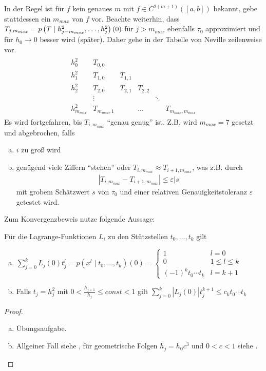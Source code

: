 \label{7.3.7}
In der Regel ist für $f$ kein genaues $m$ mit $f\in C^{2(m+1)}([a,b])$
bekannt,
gebe stattdessen ein $m_{max}$ von $f$ vor.
Beachte weiterhin, dass 
$T_{j,m_{max}}=p\left( T \mid h_{j-m_{max}}^2,\dotsc,h_j^2 \right)(0)$
für $j>m_{max}$ ebenfalls $\tau_0$ approximiert
und für $h_0\to 0$ besser wird (später).
Daher gehe in der Tabelle von Neville zeilenweise vor.
\begin{align*}
  \begin{array}{lccccc}
    h_0^2 & T_{0,0}\\
    h_1^2 & T_{1,0} & T_{1,1}\\
    h_2^2 & T_{2,0} & T_{2,1} & T_{2,2} \\
          & \vdots&&&\ddots\\
    h_{m_{max}}^2 & T_{m_{max},1} &&\dots && T_{m_{max},m_{max}}
  \end{array}
\end{align*}
\label{im7.3.7}
Es wird fortgefahren, bis $T_{i,m_{max}}$ \enquote{genau genug} ist.
Z.B. wird $m_{max}=7$ gesetzt und abgebrochen, falls
\begin{enumerate}[a)]
\item $i$ zu groß wird
\item genügend viele Ziffern \enquote{stehen}
  oder $T_{i,m_{max}}\approx T_{i+1,m_{max}}$,
  was z.B. durch 
  \begin{gather}
    \left| T_{i,m_{max}}-T_{i+1,m_{max}}\right|\leq \varepsilon|s|
    \label{VII.3.20}
  \end{gather}
  mit grobem Schätzwert $s$ von $\tau_0$ und einer relativen
  Genauigkeitstoleranz $\varepsilon$ getestet wird.
\end{enumerate}

Zum Konvergenzbeweis nutze folgende Aussage:

\begin{Leme}\label{7.3.8}
  Für die Lagrange-Funktionen $L_i$ 
  zu den Stützstellen $t_0,\dotsc, t_k$ gilt
  \begin{enumerate}[a)]
  \item $\sum_{j=0}^kL_j(0)t_j^l=p(x^l\mid t_0,\dotsc,t_k)(0)
    =\begin{cases}
      1 &l=0\\
      0&1\leq l\leq k\\
      (-1)^kt_0\dotsm t_k & l=k+1
    \end{cases}$
  \item Falls $t_j=h_j^2$ mit $0<\frac{h_{j+1}}{h_j}\leq const<1$ gilt
      $\sum_{j=0}^k\left|L_j(0)\right|t_j^{k+1}\leq
      c_kt_0\dotsm t_k$
  \end{enumerate}
  \begin{proof}~
    \begin{enumerate}[a)]
    \item Übungsaufgabe.
    \item Allgeiner Fall siehe \cite{stoerbulirsch},
      für geometrische Folgen $h_j=h_0c^3$ und $0<c<1$ siehe
      \cite{stoer}. 
    \end{enumerate}
  \end{proof}
\end{Leme}

